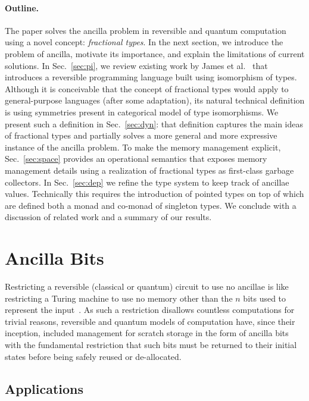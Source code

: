 \documentclass[sigplan,10pt,review,anonymous]{acmart}
\begin{document}
\paragraph*{Outline.} The paper solves the ancilla problem in
reversible and quantum computation using a novel concept:
\emph{fractional types}. In the next section, we introduce the problem
of ancilla, motivate its importance, and explain the limitations of
current solutions. In Sec.~\ref{sec:pi}, we review existing work by
James et al.~\cite{rc2011,rc2012,James:2012:IE:2103656.2103667} that
introduces a reversible programming language built using isomorphism
of types. Although it is conceivable that the concept of fractional
types would apply to general-purpose languages (after some
adaptation), its natural technical definition is using symmetries
present in categorical model of type isomorphisms. We present such a
definition in Sec.~\ref{sec:dyn}: that definition captures the main
ideas of fractional types and partially solves a more general and more
expressive instance of the ancilla problem. To make the memory
management explicit, Sec.~\ref{sec:space} provides an operational
semantics that exposes memory management details using a realization
of fractional types as first-class garbage collectors. In
Sec.~\ref{sec:dep} we refine the type system to keep track of ancillae
values. Technically this requires the introduction of pointed types on
top of which are defined both a monad and co-monad of singleton
types. We conclude with a discussion of related work and a summary of
our results.

\section{Ancilla Bits}
\label{sec:examples}
 
Restricting a reversible (classical or quantum) circuit to use no
ancillae is like restricting a Turing machine to use no memory other
than the $n$ bits used to represent the
input~\cite{DBLP:conf/innovations/AaronsonGS17}. As such a restriction
disallows countless computations for trivial reasons, reversible and
quantum models of computation have, since their inception, included
management for scratch storage in the form of ancilla
bits~\cite{Toffoli:1980} with the fundamental restriction that such
bits must be returned to their initial states before being safely
reused or de-allocated.

\subsection{Applications}
 
\end{document}
